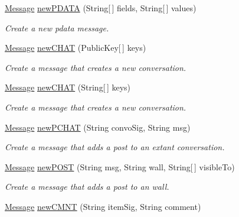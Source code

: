 \begin{DoxyCompactItemize}
\hyperlink{classballmerpeak_1_1turtlenet_1_1shared_1_1Message}{Message} \hyperlink{classballmerpeak_1_1turtlenet_1_1server_1_1MessageFactory_a1a8e1c48e4a813a743ddc65fc73616bb}{new\-P\-D\-A\-T\-A} (String\mbox{[}$\,$\mbox{]} fields, String\mbox{[}$\,$\mbox{]} values)
\begin{DoxyCompactList}\small\item\em Create a new pdata message. \end{DoxyCompactList}\item 
\hyperlink{classballmerpeak_1_1turtlenet_1_1shared_1_1Message}{Message} \hyperlink{classballmerpeak_1_1turtlenet_1_1server_1_1MessageFactory_abe8168e826ccb131414c28811af014ec}{new\-C\-H\-A\-T} (Public\-Key\mbox{[}$\,$\mbox{]} keys)
\begin{DoxyCompactList}\small\item\em Create a message that creates a new conversation. \end{DoxyCompactList}\item 
\hyperlink{classballmerpeak_1_1turtlenet_1_1shared_1_1Message}{Message} \hyperlink{classballmerpeak_1_1turtlenet_1_1server_1_1MessageFactory_a0af47a494cce68d272366b9c5bf486bb}{new\-C\-H\-A\-T} (String\mbox{[}$\,$\mbox{]} keys)
\begin{DoxyCompactList}\small\item\em Create a message that creates a new conversation. \end{DoxyCompactList}\item 
\hyperlink{classballmerpeak_1_1turtlenet_1_1shared_1_1Message}{Message} \hyperlink{classballmerpeak_1_1turtlenet_1_1server_1_1MessageFactory_a8b3f97caecf16fb1438477a781cfefc1}{new\-P\-C\-H\-A\-T} (String convo\-Sig, String msg)
\begin{DoxyCompactList}\small\item\em Create a message that adds a post to an extant conversation. \end{DoxyCompactList}\item 
\hyperlink{classballmerpeak_1_1turtlenet_1_1shared_1_1Message}{Message} \hyperlink{classballmerpeak_1_1turtlenet_1_1server_1_1MessageFactory_a5e92918871b2aa9a8263e70c0d73e51c}{new\-P\-O\-S\-T} (String msg, String wall, String\mbox{[}$\,$\mbox{]} visible\-To)
\begin{DoxyCompactList}\small\item\em Create a message that adds a post to an wall. \end{DoxyCompactList}\item 
\hyperlink{classballmerpeak_1_1turtlenet_1_1shared_1_1Message}{Message} \hyperlink{classballmerpeak_1_1turtlenet_1_1server_1_1MessageFactory_a82da74dad414bf54a6477d26e33ef2e0}{new\-C\-M\-N\-T} (String item\-Sig, String comment)

\end{DoxyCompactItemize}
